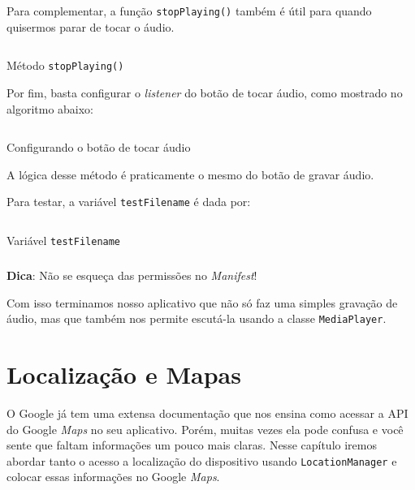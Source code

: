 \documentclass[a4paper,12pt,brazil,oneside]{book}
\begin{document}
\begin{singlespace}
		Para complementar, a função \texttt{stopPlaying()} também é útil para quando quisermos parar de tocar o áudio.
		
		\begin{listing}[H]
		\inputminted[linenos=true,fontsize=\small,frame=lines, framesep=2mm, tabsize=2,numbersep=5pt]{java}{src/api/audio/stoplaying.java}
		\caption{Método \texttt{stopPlaying()}}
		\label{code:audiostopplaying}
		\end{listing} 		

		Por fim, basta configurar o \emph{listener} do botão de tocar áudio, como mostrado no algoritmo abaixo:

		\begin{listing}[H]
		\inputminted[linenos=true,fontsize=\small,frame=lines, framesep=2mm, tabsize=2,numbersep=5pt]{java}{src/api/audio/playlistener.java}
		\caption{Configurando o botão de tocar áudio}
		\label{code:audioplaylistener}
		\end{listing} 		

		A lógica desse método é praticamente o mesmo do botão de gravar áudio. 

		Para testar, a variável \texttt{testFilename} é dada por:

		\begin{listing}[H]
		\inputminted[linenos=true,fontsize=\small,frame=lines, framesep=2mm, tabsize=2,numbersep=5pt]{java}{src/api/audio/testfilename.java}
		\caption{Variável \texttt{testFilename}}
		\label{code:audiofile}
		\end{listing} 		

\begin{framed}
\paragraph{}\textbf{Dica}: Não se esqueça das permissões no \emph{Manifest}!
\textit{}
\end{framed}

		Com isso terminamos nosso aplicativo que não só faz uma simples gravação de áudio, mas que também nos permite escutá-la usando a classe \texttt{MediaPlayer}.



\chapter{Localização e Mapas}

		O Google já tem uma extensa documentação que nos ensina como acessar a API do Google \emph{Maps} no seu aplicativo. Porém, muitas vezes ela pode confusa e você sente que faltam informações um pouco mais claras. Nesse capítulo iremos abordar tanto o acesso a localização do dispositivo usando \texttt{LocationManager} e colocar essas informações no Google \emph{Maps}.


\end{singlespace}
\end{document}

